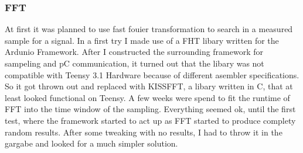 \documentclass{book}
\begin{document}
\subsubsection{FFT}
At first it was planned to use fast fouier transformation to search in a measured sample for a signal. In a first try I made use of a FHT libary written for the Ardunio Framework. After I constructed the surrounding framework for sampeling and pC communication, it turned out that the libary was not compatible with Teensy 3.1 Hardware because of different asembler specifications. So it got thrown out and replaced with KISSFFT, a libary written in C, that at least looked functional on Teensy.
A few weeks were spend to fit the runtime of FFT into the time window of the sampling. Everything seemed ok, until the first test, where the framework started to act up as FFT started to produce complety random results. After some tweaking with no results, I had to throw it in the gargabe and looked for a much simpler solution.
\end{document}
